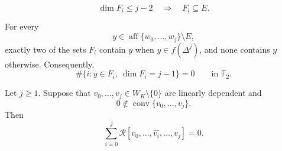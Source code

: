 \documentclass[10pt,a4paper]{amsart}
\DeclareMathOperator{\conv}{conv}
\newcommand{\F}{\mathbb F_2}
\begin{document}
\begin{equation}\label{eq:low-dimensional-facet-image}
 \dim F_i\leq j-2
 \quad\Longrightarrow\quad
 F_i\subseteq E.
\end{equation}

\begin{lemma}
\label{lem:generic-degenerate-fiber}
For every
\[
 y\in\operatorname{aff}\{w_0,\ldots,w_j\}\setminus E,
\]
exactly two of the sets \(F_i\) contain \(y\) when
\(y\in f(\Delta^j)\), and none contains \(y\) otherwise.  Consequently,
\[
 \#\{i:y\in F_i,\ \dim F_i=j-1\}=0
 \qquad\text{in }\F.
\]
\end{lemma}

\begin{lemma}
\label{lem:degenerate-radial-cancellation}
Let \(j\geq1\).  Suppose that
\(v_0,\ldots,v_j\in W_K\setminus\{0\}\) are linearly dependent and
\[
 0\notin\conv\{v_0,\ldots,v_j\}.
\]
Then
\[
 \sum_{i=0}^j
 \mathcal R[v_0,\ldots,\widehat{v_i},\ldots,v_j]=0.
\]
\end{lemma}
\end{document}
